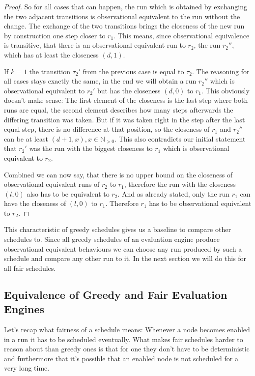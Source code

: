\begin{proof}
    So for all cases that can happen, the run which is obtained by exchanging the two adjacent transitions is observational equivalent to the run without the change.
    The exchange of the two transitions brings the closeness of the new run by construction one step closer to \(r_1\).
    This means, since observational equivalence is transitive, that there is an observational equivalent run to \(r_2\), the run \(r_2''\),  which has at least the closeness \((d, 1)\).

    If \(k = 1\) the transition \(\tau_2'\) from the previous case is equal to \(\tau_2\).
    The reasoning for all cases stays exactly the same, in the end we will obtain a run \(r_2''\) which is observational equivalent to \(r_2'\) but has the closeness \((d, 0)\) to \(r_1\).
    This obviously doesn't make sense: The first element of the closeness is the last step where both runs are equal, the second element describes how many steps afterwards the differing transition was taken.
    But if it was taken right in the step after the last equal step, there is no difference at that position, so the closeness of \(r_1\) and \(r_2''\) can be at least \((d+1, x), x \in \mathbb{N}_{>0}\).
    This also contradicts our initial statement that \(r_2'\) was the run with the biggest closeness to \(r_1\) which is observational equivalent to \(r_2\).

    Combined we can now say, that there is no upper bound on the closeness of observational equivalent runs of \(r_2\) to \(r_1\), therefore the run with the closeness \((l, 0)\) also has to be equivalent to \(r_2\).
    And as already stated, only the run \(r_1\) can have the closeness of \((l, 0)\) to \(r_1\).
    Therefore \(r_1\) has to be observational equivalent to \(r_2\).
  \end{proof}


  This characteristic of greedy schedules gives us a baseline to compare other schedules to.
  Since all greedy schedules of an evaluation engine produce observational equivalent behaviours we can choose any run produced by such a schedule and compare any other run to it.
  In the next section we will do this for all fair schedules.

  \subsection{Equivalence of Greedy and Fair Evaluation Engines}
  \label{sec:behaviours:equivalence_without_timing:greedy_fair}

  Let's recap what fairness of a schedule means: Whenever a node becomes enabled in a run it has to be scheduled eventually.
  What makes fair schedules harder to reason about than greedy ones is that for one they don't have to be deterministic and furthermore that it's possible that an enabled node is not scheduled for a very long time.

